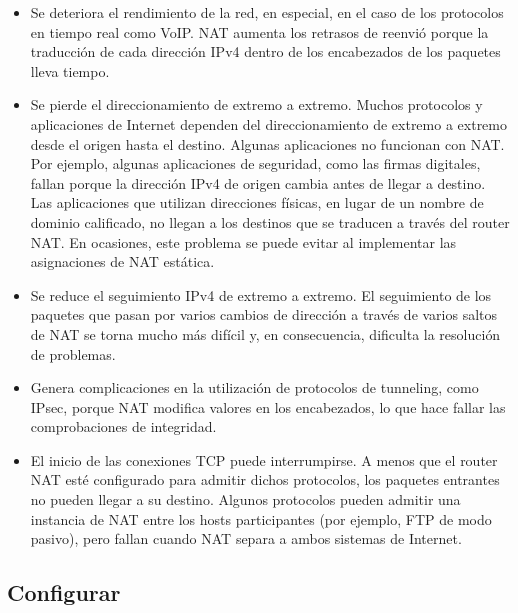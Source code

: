 \documentclass[
	12pt, %
	fleqn, %
	a4paper, %
	oneside, %
]{LegrandOrangeBook}
\begin{document}
\begin{itemize}
\item Se deteriora el rendimiento de la red, en especial, en el caso de los protocolos en tiempo real como VoIP. NAT aumenta los retrasos de reenvió porque la traducción de cada dirección IPv4 dentro de los encabezados de los paquetes lleva tiempo.
\item Se pierde el direccionamiento de extremo a extremo. Muchos protocolos y aplicaciones de Internet dependen del direccionamiento de extremo a extremo desde el origen hasta el destino. Algunas aplicaciones no funcionan con NAT. Por ejemplo, algunas aplicaciones de seguridad, como las firmas digitales, fallan porque la dirección IPv4 de origen cambia antes de llegar a destino. Las aplicaciones que utilizan direcciones físicas, en lugar de un nombre de dominio calificado, no llegan a los destinos que se traducen a través del router NAT. En ocasiones, este problema se puede evitar al implementar las asignaciones de NAT estática.
\item Se reduce el seguimiento IPv4 de extremo a extremo. El seguimiento de los paquetes que pasan por varios cambios de dirección a través de varios saltos de NAT se torna mucho más difícil y, en consecuencia, dificulta la resolución de problemas.
\item Genera complicaciones en la utilización de protocolos de tunneling, como IPsec, porque NAT modifica valores en los encabezados, lo que hace fallar las comprobaciones de integridad.
\item El inicio de las conexiones TCP puede interrumpirse. A menos que el router NAT esté configurado para admitir dichos protocolos, los paquetes entrantes no pueden llegar a su destino. Algunos protocolos pueden admitir una instancia de NAT entre los hosts participantes (por ejemplo, FTP de modo pasivo), pero fallan cuando NAT separa a ambos sistemas de Internet.
\end{itemize}
\subsection{Configurar}
\end{document}
